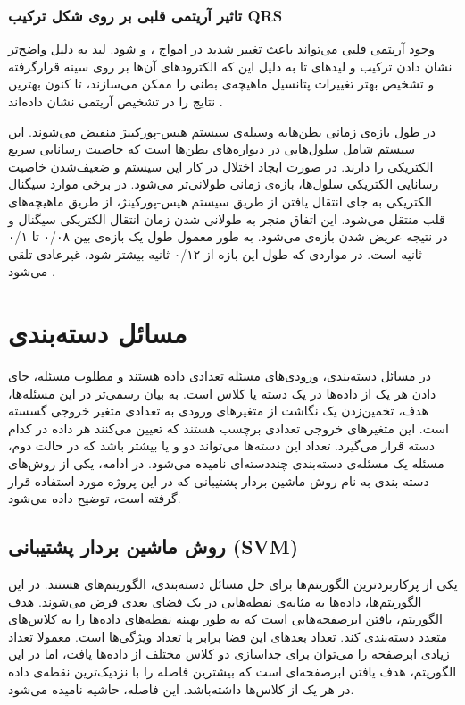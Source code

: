  \subsubsection{تاثیر آریتمی قلبی بر روی شکل ترکیب QRS}
 وجود آریتمی قلبی می‌تواند باعث تغییر شدید در امواج ،  و  شود. لید  به دلیل واضح‌تر نشان دادن ترکیب  و لیدهای  تا  به دلیل این که الکترودهای آن‌ها بر روی سینه قرارگرفته و تشخیص بهتر تغییرات پتانسیل ماهیچه‌ی بطنی را ممکن می‌سازند، تا کنون بهترین نتایج را در تشخیص آریتمی نشان داده‌اند \cite{ECGSurvey}.

در طول بازه‌ی زمانی  بطن‌هابه وسیله‌ی سیستم هیس-پورکینژ منقبض می‌شوند. این سیستم شامل سلول‌هایی در دیواره‌های بطن‌ها است که خاصیت رسانایی سریع الکتریکی را دارند. در صورت ایجاد اختلال در کار این سیستم و ضعیف‌شدن خاصیت رسانایی الکتریکی سلول‌ها، بازه‌ی زمانی  طولانی‌تر می‌شود. در برخی موارد سیگنال الکتریکی به جای انتقال یافتن از طریق سیستم هیس-پورکینژ، از طریق ماهیچه‌های قلب منتقل می‌شود. این اتفاق منجر به طولانی شدن زمان انتقال الکتریکی سیگنال و در نتیجه عریض شدن بازه‌ی  می‌شود.
 به طور معمول طول یک بازه‌ی  بین ۰/۰۸ تا ۰/۱ ثانیه است. در مواردی که طول این بازه از ۰/۱۲ ثانیه بیشتر شود،  غیرعادی تلقی می‌شود \cite{Healio}.

\section{مسائل دسته‌بندی}

در مسائل دسته‌بندی، ورودی‌های مسئله تعدادی داده هستند و مطلوب مسئله، جای دادن هر یک از داده‌ها در یک دسته یا کلاس است. به بیان رسمی‌تر در این مسئله‌ها، هدف، تخمین‌زدن یک نگاشت از متغیرهای ورودی  به تعدادی متغیر خروجی گسسته  است. این متغیرهای خروجی تعدادی برچسب هستند که تعیین می‌کنند هر داده در کدام دسته قرار می‌گیرد. تعداد این دسته‌ها می‌تواند دو و یا بیشتر باشد که در حالت دوم، مسئله یک مسئله‌ی دسته‌بندی چنددسته‌ای نامیده می‌شود. در ادامه، یکی از روش‌های دسته بندی به نام روش ماشین بردار پشتیبانی که در این پروژه مورد استفاده قرار گرفته است، توضیح داده می‌شود.  

\subsection{روش ماشین بردار پشتیبانی (SVM)}
یکی از پرکاربردترین الگوریتم‌ها برای حل مسائل دسته‌بندی، الگوریتم‌های  هستند. در این الگوریتم‌ها، داده‌ها به مثابه‌ی نقطه‌هایی در یک فضای بعدی فرض می‌شوند. هدف الگوریتم، یافتن ابرصفحه‌هایی است که به طور بهینه نقطه‌های داده‌ها را به کلاس‌های متعدد دسته‌بندی کند. تعداد بعدهای این فضا  برابر با تعداد ویژگی‌ها است. معمولا تعداد زیادی ابرصفحه را می‌توان برای جداسازی دو کلاس مختلف از داده‌ها یافت، اما در این الگوریتم، هدف یافتن ابرصفحه‌ای است که بیشترین فاصله را با نزدیک‌ترین نقطه‌ی داده در هر یک از کلاس‌ها داشته‌باشد. این فاصله، حاشیه نامیده می‌شود. 

